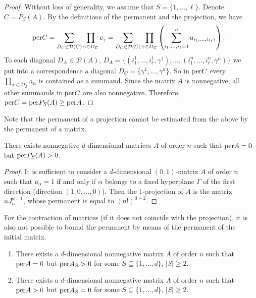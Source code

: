 \documentclass[a4paper]{article}
\begin{document}
\begin{proof}
Without loss of generality, we assume that $S = \{1, \ldots, \ell \} $. 
Denote $C = P_S(A)$. By the definitions of the permanent and the projection, we have
\begin{gather*}
{\rm per} C = \sum\limits_{D_C \in \mathcal{D}(C)} \prod\limits_{\gamma \in D_C} c_{\gamma} = 
\sum\limits_{D_C \in \mathcal{D}(C)} \prod\limits_{\gamma \in D_C} \left(\sum\limits_{i_1, \ldots, i_{\ell} = 1}^n a_{i_1, \ldots, i_\ell, \gamma} \right).
\end{gather*} 
To each diagonal $D_A \in \mathcal{D}(A)$, $D_A = \{ (i^1_1, \ldots,i^1_\ell, \gamma^1 ) , \ldots, (i^n_1, \ldots,i^n_\ell, \gamma^n ) \}$ we put into a correspondence a diagonal  $D_C = \{  \gamma^1  , \ldots,  \gamma^n  \}$. So in ${\rm per} C$  every $\prod\limits_{\alpha\in D_A} a_{\alpha}$ is contained as a summand. Since the matrix $A$ is nonnegative, all other summands in ${\rm per} C$ are also nonnegative. Therefore, ${\rm per} C = {\rm per} P_S(A) \geq {\rm per} A$.  
\end{proof}


Note that the permanent of a projection cannot be estimated from the above by the permanent of a matrix.


\begin{zam}
There exists nonnegative $d$-dimensional matrices $A$ of order $n$ such that ${\rm per} A = 0$ but ${\rm per} P_S (A) >0$.
\end{zam}

\begin{proof}
It is sufficient to consider a $d$-dimensional $(0,1)$-matrix $A$ of order $n$ such that $a_{\alpha} = 1$ if and only if  $\alpha$ belongs to a fixed hyperplane $\Gamma$ of the first direction (direction $(1, 0, \ldots, 0)$). Then the $1$-projection of $A$ is  the matrix $n J^{d-1}_n$, whose permanent is equal to $(n!)^{d-2}$. 
\end{proof}


For the contraction of matrices (if it does not coincide with the projection), it is also not possible to bound the permanent by means of the permanent of the initial matrix. 


\begin{zam}
\item
\begin{enumerate}
\item There exists a $d$-dimensional nonnegative matrix $A$ of order $n$ such that ${\rm per} A = 0$ but ${\rm per} A_S > 0 $ for some $S \subseteq \{1, \ldots, d \}$, $|S| \geq 2$.
\item  There exists a $d$-dimensional nonnegative matrix $A$ of order $n$ such that ${\rm per} A > 0$ but ${\rm per} A_S = 0 $ for some $S \subseteq \{1, \ldots, d \}$, $|S| \geq 2$.
\end{enumerate}
\end{zam}
\end{document}
